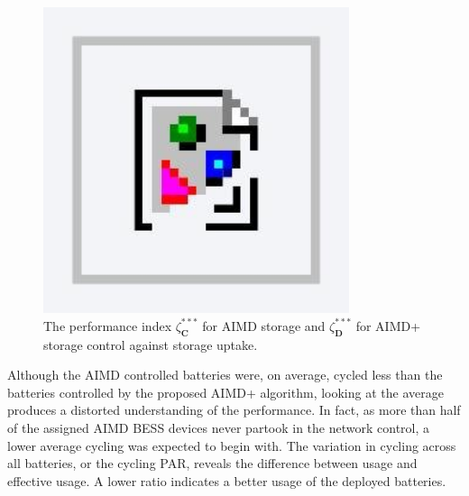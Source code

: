 \begin{figure}\centering
 \includegraphics[width=0.8\textwidth]{foo}
 \caption{The performance index $\zeta_\textbf{C}^{***}$ for AIMD storage and $\zeta_\textbf{D}^{***}$ for AIMD+ storage control against storage uptake.}
 \label{fig-storage-par}
\end{figure}

Although the AIMD controlled batteries were, on average, cycled less than the batteries controlled by the proposed AIMD+ algorithm, looking at the average produces a distorted understanding of the performance. In fact, as more than half of the assigned AIMD BESS devices never partook in the network control, a lower average cycling was expected to begin with. The variation in cycling across all batteries, or the cycling PAR, reveals the difference between usage and effective usage. A lower ratio indicates a better usage of the deployed batteries.